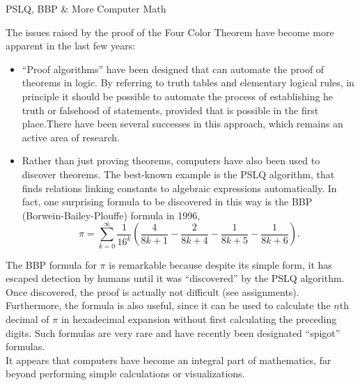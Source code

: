 \documentclass[smaller,hyperref={CJKbookmarks=true}]{beamer}
\begin{document}
\begin{frame}{PSLQ, BBP \& More Computer Math}
\begin{spacing}{1.05}
The issues raised by the proof of the Four Color Theorem have become
more apparent in the last few years:
\begin{itemize}
  \item ``Proof algorithms'' have been designed that can automate the proof of theorems in logic. By referring to truth tables and elementary logical rules, in principle it should be possible to automate the process of establishing he truth or falsehood of statements, provided that is possible in the first place.There have been several successes in this approach, which remains an active area of research.
  \item Rather than just proving theorems, computers have also been used to discover theorems. The best-known example is the PSLQ algorithm, that finds relations linking constants to algebraic expressions automatically. In fact, one surprising formula to be discovered in this way is the BBP (Borwein-Bailey-Plouffe) formula in 1996,
      \[\pi=\sum_{k=0}^{\infty}\frac{1}{16^k}\left(\frac{4}{8k+1}-\frac{2}{8k+4}-\frac{1}{8k+5}-\frac{1}{8k+6}\right).\]
\end{itemize}
\newpage
The BBP formula for $\pi$ is remarkable because despite its simple form, it
has escaped detection by humans until it was ``discovered'' by the PSLQ
algorithm. Once discovered, the proof is actually not difficult (see
assignments).\\[5pt]
Furthermore, the formula is also useful, since it can be used to calculate
the $n$th decimal of $\pi$ in hexadecimal expansion without first calculating the
preceding digits. Such formulas are very rare and have recently been
designated ``spigot'' formulas.\\[6pt]
It appears that computers have become an integral part of mathematics,
far beyond performing simple calculations or visualizations.
\end{spacing}
\end{frame}
\end{document}
